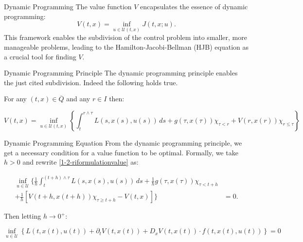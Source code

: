 \documentclass[10pt, compress]{beamer}
\begin{document}
\begin{frame}{Dynamic Programming}
    The value function \(V\) encapsulates the essence of dynamic programming:
    \[
        V(t,x)=\inf_{u\in \mathcal{U}(t,x)}J(t,x;u).
    \]
    This framework enables the subdivision of the control problem into smaller, more manageable problems, leading to the Hamilton-Jacobi-Bellman (HJB) equation as a crucial tool for finding \(V\).
\end{frame}

\begin{frame}{Dynamic Programming Principle}
    The dynamic programming principle enables the just cited subdivision. Indeed the following holds true.

    \begin{theorem}
        For any $(t,x)\in\overline{Q}$ and any $r\in I$ then:

    \begin{equation}\label{1-2-riformulationvalue}
        V(t,x)=\inf_{u\in\mathcal{U}(t,x)}\left\{\int_t^{r\land\tau}L(s,x(s),u(s))\,ds+g(\tau,x(\tau))\chi_{\tau<r}+V(r,x(r))\chi_{r\leq\tau}\right\}
    \end{equation}
    \end{theorem}
\end{frame}

\begin{frame}{Dynamic Programming Equation}
    From the dynamic programming principle, we get a necessary condition for a value function to be optimal. Formally, we take $h>0$ and rewrite \ref{1-2-riformulationvalue} as:

    \begin{align*}
        \inf_{u\in\mathcal{U}}\{\frac{1}{h}\int_t^{(t+h)\land\tau} L(s,x(s),u(s))\,ds + \frac{1}{h}g(\tau,x(\tau))\chi_{\tau<t+h} \\
        + \frac{1}{h}\left[V(t+h,x(t+h))\chi_{\tau\geq t+h} - V(t,x)\right]\} & = 0.
    \end{align*}

    Then letting $h\to0^+$:

    \begin{equation}\label{dynprogreqbad}
        \inf_{u\in\mathcal{U}}\left\{L(t,x(t),u(t)) + \partial_tV(t,x(t)) + D_xV(t,x(t))\cdot f(t,x(t),u(t))\right\}=0
    \end{equation}
\end{frame}
\end{document}

